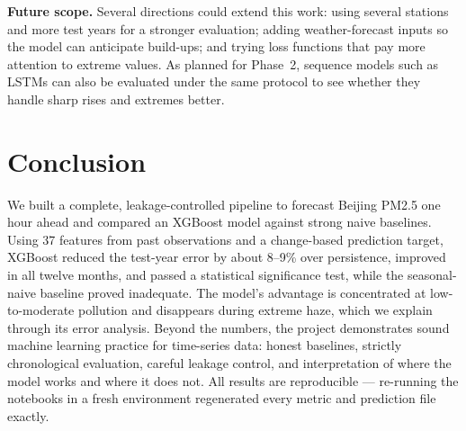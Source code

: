 \documentclass[onecolumn,11pt,journal]{IEEEtran}
\begin{document}
\textbf{Future scope.} Several directions could extend this work: using several stations and more test years for a stronger evaluation; adding weather-forecast inputs so the model can anticipate build-ups; and trying loss functions that pay more attention to extreme values. As planned for Phase~2, sequence models such as LSTMs \cite{hochreiter1997} can also be evaluated under the same protocol to see whether they handle sharp rises and extremes better.

\section{Conclusion}
We built a complete, leakage-controlled pipeline to forecast Beijing PM2.5 one hour ahead and compared an XGBoost model against strong naive baselines. Using 37 features from past observations and a change-based prediction target, XGBoost reduced the test-year error by about 8--9\% over persistence, improved in all twelve months, and passed a statistical significance test, while the seasonal-naive baseline proved inadequate. The model's advantage is concentrated at low-to-moderate pollution and disappears during extreme haze, which we explain through its error analysis. Beyond the numbers, the project demonstrates sound machine learning practice for time-series data: honest baselines, strictly chronological evaluation, careful leakage control, and interpretation of where the model works and where it does not. All results are reproducible --- re-running the notebooks in a fresh environment regenerated every metric and prediction file exactly.



\end{document}
